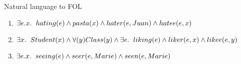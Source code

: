 \documentclass[12pt]{article}
\newenvironment{exercise}[2][Exercise]{\begin{trivlist}
\item[\hskip \labelsep {\bfseries #1}\hskip \labelsep {\bfseries #2.}]}{\end{trivlist}}
\begin{document}
\begin{exercise}{4} Natural language to FOL	
\begin{enumerate}[label=(\alph*)]

\item $\exists e.x. \hspace{0.2cm} hating(e) \land pasta(x) \land hater(e,Juan) \land hatee(e,x)$

\item $\exists x. \hspace{0.2cm} Student(x) \land \forall(y) Class(y) \land \exists e. \hspace{0.2cm} liking(e) \land liker(e, x) \land likee(e, y)$

\item $\exists e.x. \hspace{0.2cm} seeing(e) \land seer(e, Marie) \land seen(e, Marie) $
\end{enumerate}
\end{exercise}
\clearpage
\end{document}
